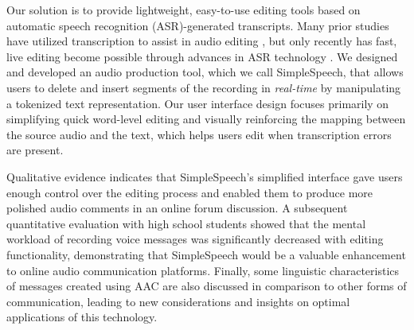 Our solution is to provide lightweight, easy-to-use editing tools based on automatic speech recognition (ASR)-generated transcripts.
Many prior studies have utilized transcription to assist in audio editing \cite{casares,rubin,whittaker_semantic}, but only recently has fast, live editing become possible through advances in ASR technology \cite{baker,saon}.
We designed and developed an audio production tool, which we call SimpleSpeech, that allows users to delete and insert segments of the recording in \textit{real-time} by manipulating a tokenized text representation. 
Our user interface design focuses primarily on simplifying quick word-level editing and visually reinforcing the mapping between the source audio and the text, which helps users edit when transcription errors are present.

Qualitative evidence indicates that SimpleSpeech's simplified interface gave users enough control over the editing process and enabled them to produce more polished audio comments in an online forum discussion.
A subsequent quantitative evaluation with high school students showed that the mental workload of recording voice messages was significantly decreased with editing functionality, demonstrating that SimpleSpeech would be a valuable enhancement to online audio communication platforms.
Finally, some linguistic characteristics of messages created using AAC are also discussed in comparison to other forms of communication, leading to new considerations and insights on optimal applications of this technology.